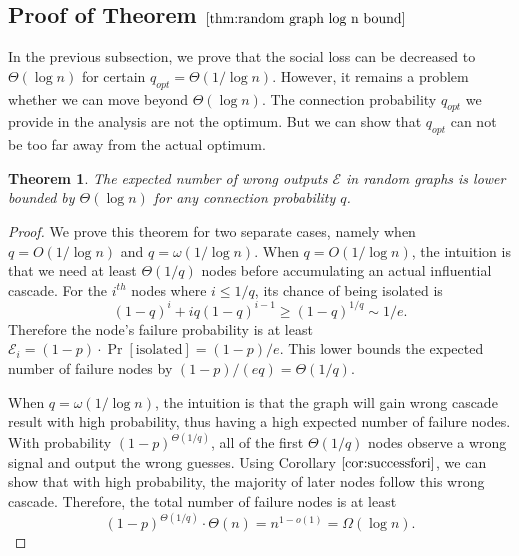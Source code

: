 \documentclass[a4paper,UKenglish]{lipics}
\newtheorem{thm}{Theorem}[section] %
\theoremstyle{definition}
\begin{document}
\subsection {Proof of Theorem $\ref{thm:random graph log n bound}$}
In the previous subsection, we prove that the social loss can be decreased to $\Theta(\log n)$ for certain $q_{opt} = \Theta(1 / \log n)$.
However, it remains a problem whether we can move beyond $\Theta(\log n)$.
The connection probability $q_{opt}$ we provide in the analysis are not the optimum.
But we can show that $q_{opt}$ can not be too far away from the actual optimum.
\begin{thm}
The expected number of wrong outputs $\mathcal{E}$ in random graphs is lower bounded by $\Theta(\log n)$ for any connection probability $q$.
\end{thm}
\begin{proof}
We prove this theorem for two separate cases, namely when $q = O(1 / \log n)$ and $q = \omega(1 / \log n)$. 
When $q = O(1 / \log n)$, the intuition is that we need at least $\Theta(1/q)$ nodes before accumulating an actual influential cascade.
For the $i^{th}$ nodes where $i \le 1/q$, its chance of being isolated is 
\begin{equation*}
	(1 - q)^{i} + iq(1-q)^{i-1}
\ge
	(1 - q)^{1 / q}
\sim
	{1 / e}.
\end{equation*}
Therefore the node's failure probability is at least $\mathcal{E}_i = (1-p)\cdot\Pr[\text{isolated}] = (1-p)/e$.
This lower bounds the expected number of failure nodes by $(1-p)/(eq) = \Theta(1/q)$.

When $q = \omega(1 / \log n)$, 
	the intuition is that the graph will gain wrong cascade result with high probability,
	thus having a high expected number of failure nodes.
With probability $(1-p)^{\Theta(1/q)}$, all of the first $\Theta(1/q)$ nodes observe a wrong signal and output the wrong guesses.
Using Corollary $\ref{cor:successfori}$, we can show that with high probability, the majority of later nodes follow this wrong cascade.
Therefore, the total number of failure nodes is at least
\begin{equation*}
(1-p)^{\Theta(1/q)}\cdot \Theta(n) = n^{1 - o(1)} = \Omega(\log n).
\end{equation*}
\end{proof}
\end{document}
